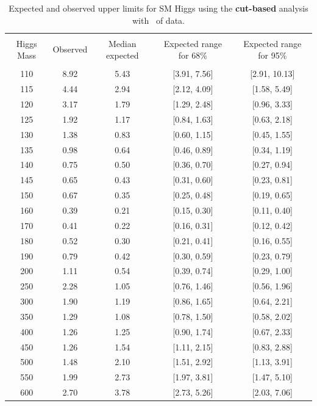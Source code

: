 \begin{table}[hbp!]
\begin{center}
\begin{tabular}{c c c c c}
\hline
\vspace{-3mm} && \\
 Higgs Mass & Observed  & Median expected & Expected range for 68\% & Expected range for 95\%   \\
\vspace{-3mm} && \\
\hline
110 & 8.92 & 5.43 & [3.91, 7.56] & [2.91, 10.13] \\
115 & 4.44 & 2.94 & [2.12, 4.09] & [1.58, 5.49] \\
120 & 3.17 & 1.79 & [1.29, 2.48] & [0.96, 3.33] \\
125 & 1.92 & 1.17 & [0.84, 1.63] & [0.63, 2.18] \\
130 & 1.38 & 0.83 & [0.60, 1.15] & [0.45, 1.55] \\
135 & 0.98 & 0.64 & [0.46, 0.89] & [0.34, 1.19] \\
140 & 0.75 & 0.50 & [0.36, 0.70] & [0.27, 0.94] \\
145 & 0.65 & 0.43 & [0.31, 0.60] & [0.23, 0.81] \\
150 & 0.67 & 0.35 & [0.25, 0.48] & [0.19, 0.65] \\
160 & 0.39 & 0.21 & [0.15, 0.30] & [0.11, 0.40] \\
170 & 0.41 & 0.22 & [0.16, 0.31] & [0.12, 0.42] \\
180 & 0.52 & 0.30 & [0.21, 0.41] & [0.16, 0.55] \\
190 & 0.79 & 0.42 & [0.30, 0.59] & [0.23, 0.79] \\
200 & 1.11 & 0.54 & [0.39, 0.74] & [0.29, 1.00] \\
250 & 2.28 & 1.05 & [0.76, 1.46] & [0.56, 1.96] \\
300 & 1.90 & 1.19 & [0.86, 1.65] & [0.64, 2.21] \\
350 & 1.29 & 1.08 & [0.78, 1.50] & [0.58, 2.02] \\
400 & 1.26 & 1.25 & [0.90, 1.74] & [0.67, 2.33] \\
450 & 1.26 & 1.54 & [1.11, 2.15] & [0.83, 2.88] \\
500 & 1.48 & 2.10 & [1.51, 2.92] & [1.13, 3.91] \\
550 & 1.99 & 2.73 & [1.97, 3.81] & [1.47, 5.10] \\
600 & 2.70 & 3.78 & [2.73, 5.26] & [2.03, 7.06] \\
\hline
\end{tabular}
\caption{Expected and observed upper limits for SM Higgs using the
  {\bf cut-based} analysis with \intlumiEightTeV\ of data.}
\label{tab:cutbase_uls}
\end{center}
\end{table}

